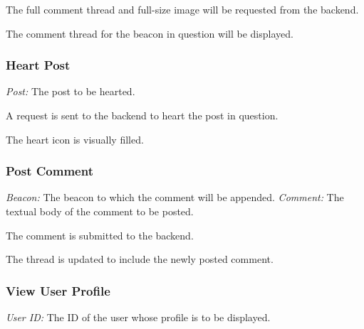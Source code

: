                 The full comment thread and full-size image will be requested from
                the backend.

                The comment thread for the beacon in question will be displayed.

                

        \subsubsection{Heart Post}
                \textit{Post:} The post to be hearted.

                A request is sent to the backend to heart the post in question.

                The heart icon is visually filled.

                

        \subsubsection{Post Comment}
                \textit{Beacon:} The beacon to which the comment will be appended.
                                \newline
                \textit{Comment:} The textual body of the comment to be posted.

                The comment is submitted to the backend.

                The thread is updated to include the newly posted comment.

                

        \subsubsection{View User Profile}
                \textit{User ID:} The ID of the user whose profile is to be
                                        displayed.

